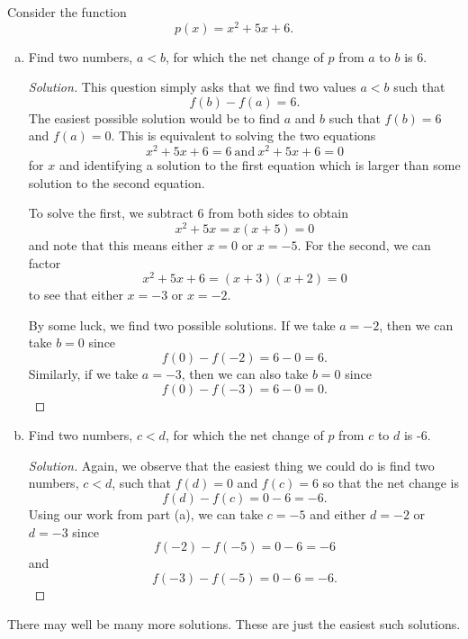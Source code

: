 \documentclass[12pt]{amsart}
\begin{document}
\begin{thm}\label{bonus}
  Consider the function
  $$p(x) = x^2 + 5x + 6.$$
  \begin{enumerate}[(a)]
  \item
    Find two numbers, $a < b$, for which the net change of $p$ from $a$ to $b$ is 6.
    \begin{proof}[Solution]
      This question simply asks that we find two values $a < b$ such that
      $$f(b) - f(a) = 6.$$
      The easiest possible solution would be to find $a$ and $b$ such that $f(b) = 6$ and $f(a) = 0$.
      This is equivalent to solving the two equations
      $$x^2 + 5x + 6 = 6\ \text{and}\ x^2 + 5x + 6 = 0$$
      for $x$ and identifying a solution to the first equation which is larger than some solution to the second equation.

      To solve the first, we subtract 6 from both sides to obtain
      $$x^2 + 5x = x(x + 5) = 0$$
      and note that this means either $x = 0$ or $x = -5$.
      For the second, we can factor
      $$x^2 + 5x + 6 = (x + 3)(x + 2) = 0$$
      to see that either $x = -3$ or $x = -2$.

      By some luck, we find two possible solutions.
      If we take $a = -2$, then we can take $b = 0$ since
      $$f(0) - f(-2) = 6 - 0 = 6.$$
      Similarly, if we take $a = -3$, then we can also take $b = 0$ since
      $$f(0) - f(-3) = 6 - 0 = 0.$$
    \end{proof}
  \item
    Find two numbers, $c < d$, for which the net change of $p$ from $c$ to $d$ is -6.

        \begin{proof}[Solution]
          Again, we observe that the easiest thing we could do is find two numbers, $c < d$, such that $f(d) = 0$ and $f(c) = 6$ so that the net change is
          $$f(d) - f(c) = 0 - 6 = -6.$$
          Using our work from part (a), we can take $c = -5$ and either $d = -2$ or $d = -3$ since
          $$f(-2) - f(-5) = 0 - 6 = -6$$
          and
          $$f(-3) - f(-5) = 0 - 6 = -6.$$
        \end{proof}
  \end{enumerate}
\end{thm}

\begin{rmk}
  There may well be many more solutions.
  These are just the easiest such solutions.
\end{rmk}
\end{document}
